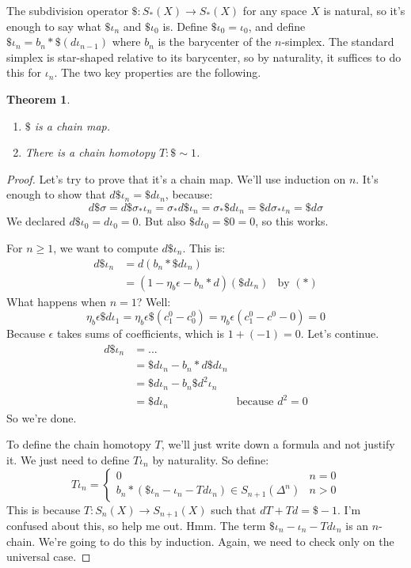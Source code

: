 \documentclass{amsart}
\theoremstyle{theorem}
\newtheorem{theorem}{Theorem}[section]
\theoremstyle{definition}
\begin{document}
The subdivision operator $\$:S_\ast(X)\to S_\ast(X)$ for any space $X$ is natural, so it's enough to say what $\$\iota_n$ and $\$\iota_0$ is. Define $\$\iota_0=\iota_0$, and define $\$\iota_n=b_n\ast\$(d\iota_{n-1})$ where $b_n$ is the barycenter of the $n$-simplex. The standard simplex is star-shaped relative to its barycenter, so by naturality, it suffices to do this for $\iota_n$. The two key properties are the following.
\begin{theorem}
\begin{enumerate}
\item $\$$ is a chain map.
\item There is a chain homotopy $T:\$\sim 1$.
\end{enumerate}
\end{theorem}
\begin{proof}
Let's try to prove that it's a chain map. We'll use induction on $n$. It's enough to show that $d\$\iota_n=\$ d\iota_n$, because:$$d\$\sigma=d\$\sigma_\ast\iota_n=\sigma_\ast d\$\iota_n=\sigma_\ast \$d\iota_n=\$ d\sigma_\ast\iota_n=\$ d\sigma$$
We declared $d\$\iota_0=d\iota_0=0$. But also $\$d\iota_0=\$0=0$, so this works.

For $n\geq 1$, we want to compute $d\$\iota_n$. This is:
\begin{align*}
d\$\iota_n & =d(b_n\ast \$ d\iota_n) & \\
 & = (1-\eta_b\epsilon-b_n\ast d)(\$ d\iota_n) & \text{by $(\ast)$}
\end{align*}
What happens when $n=1$? Well:
$$\eta_b\epsilon\$d\iota_1 = \eta_b\epsilon \$(c^0_1 - c^0_0)=\eta_b\epsilon(c^0_1 - c^0-0)=0$$
Because $\epsilon$ takes sums of coefficients, which is $1+(-1)=0$. Let's continue.
\begin{align*}
d\$\iota_n & = ... & \\
 & = \$d\iota_n - b_n\ast d\$ d\iota_n & \\
 & = \$d\iota_n - b_n\$d^2\iota_n &\\
 & = \$d\iota_n & \text{because $d^2=0$}
\end{align*}
So we're done.

To define the chain homotopy $T$, we'll just write down a formula and not justify it. We just need to define $T\iota_n$ by naturality. So define:
\begin{equation*}
T\iota_n = \begin{cases}
0 & n=0\\
b_{n}\ast(\$\iota_n - \iota_n- Td\iota_n)\in S_{n+1}(\Delta^n) & n>0
\end{cases}
\end{equation*}
This is because $T:S_n(X)\to S_{n+1}(X)$ such that $dT+Td=\$-1$. I'm confused about this, so help me out. Hmm. The term $\$\iota_n - \iota_n-Td\iota_n$ is an $n$-chain. We're going to do this by induction. Again, we need to check only on the universal case.


\end{proof}
\end{document}
